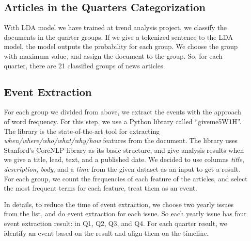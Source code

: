 \subsection{Articles in the Quarters Categorization}

With LDA model we have trained at trend analysis project,
we classify the documents in the quarter groups.
If we give a tokenized sentence to the LDA model,
the model outputs the probability for each group.
We choose the group with maximum value, and assign the document to the group.
So, for each quarter, there are 21 classified groups of news articles.

\subsection{Event Extraction}

For each group we divided from above,
we extract the events with the approach of word frequency.
For this step, we use a Python library called ``giveme5W1H''.
The library is the state-of-the-art tool for extracting
\textit{when/where/who/what/why/how} features from the document.
The library uses Stanford's CoreNLP library as its basic structure,
and give analysis results when we give a
title, lead, text, and a published date.
We decided to use columns \textit{title}, \textit{description}, \textit{body}, and a \textit{time}
from the given dataset as an input to get a result.
For each group, we count the frequencies of each feature of the articles,
and select the most frequent terms for each feature, treat them as an event.

In details, to reduce the time of event extraction,
we choose two yearly issues from the list, and do event extraction for each issue.
So each yearly issue has four event extraction result: in Q1, Q2, Q3, and Q4.
For each quarter result, we identify an event based on the result and align them on the timeline.
